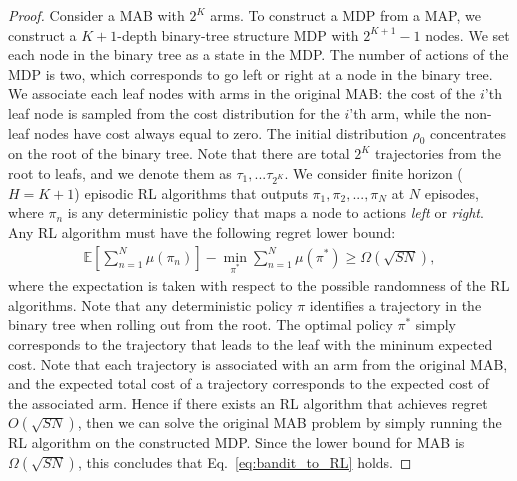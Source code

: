 \documentclass{article}
\begin{document}
\begin{proof}
Consider a MAB with $2^{K}$ arms. To construct a MDP from a MAP, we construct a $K+1$-depth binary-tree structure MDP with $2^{K+1}-1$ nodes. We set each node in the binary tree as a state in the MDP. The number of actions of the MDP is two, which corresponds to go left or right at a node in the binary tree. We associate each leaf nodes with arms in the original MAB: the cost of the $i$'th leaf node is sampled from the cost distribution for the $i$'th arm, while the non-leaf nodes have cost always equal to zero. The initial distribution $\rho_0$ concentrates on the root of the binary tree. Note that there are total $2^K$ trajectories from the root to leafs, and we denote them as $\tau_1,...\tau_{2^K}$. We consider finite horizon ($H=K+1$) episodic RL algorithms that outputs $\pi_1,\pi_2,...,\pi_N$ at $N$ episodes, where $\pi_n$ is any deterministic policy that maps a node to actions \emph{left} or \emph{right}. Any RL algorithm must have the following regret lower bound:
\begin{align}
\label{eq:bandit_to_RL}
\mathbb{E}[\sum_{n=1}^N \mu(\pi_n)] - \min_{\pi^*}\sum_{n=1}^N \mu(\pi^*) \geq \Omega(\sqrt{SN}),
\end{align} where the expectation is taken with respect to the possible randomness of the RL algorithms. Note that any deterministic policy $\pi$ identifies a trajectory in the binary tree when rolling out from the root. The optimal policy $\pi^*$ simply corresponds to the trajectory that leads to the leaf with the mininum expected cost. Note that each trajectory is associated with an arm from the original MAB, and the expected total cost of a trajectory corresponds to the expected cost of the associated arm. Hence if there exists an RL algorithm that achieves regret $O(\sqrt{SN})$, then we can solve the original MAB problem by simply running the RL algorithm on the constructed MDP. Since the lower bound for MAB is $\Omega(\sqrt{SN})$, this concludes that Eq.~\ref{eq:bandit_to_RL} holds. 
\end{proof}
\end{document}
